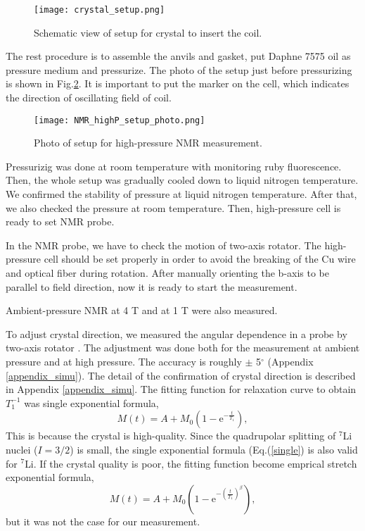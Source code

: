 \documentclass[a4,10.5pt]{report}
\begin{document}
\begin{figure}
  \centering
  \texttt{[image: crystal\_setup.png]}
  \caption{Schematic view of setup for crystal to insert the coil.}
  \label{crystal_setup}
\end{figure}

The rest procedure is to assemble the anvils and gasket, put Daphne 7575 oil as pressure medium and pressurize.
The photo of the setup just before pressurizing is shown in Fig.\ref{NMR_highP_setup_photo}.
It is important to put the marker on the cell, which indicates the direction of oscillating field of coil.

\begin{figure}
  \centering
  \texttt{[image: NMR\_highP\_setup\_photo.png]}
  \caption{Photo of setup for high-pressure NMR measurement.}
  \label{NMR_highP_setup_photo}
\end{figure}

Pressurizig was done at room temperature with monitoring ruby fluorescence.
Then, the whole setup was gradually cooled down to liquid nitrogen temperature.
We confirmed the stability of pressure at liquid nitrogen temperature.
After that, we also checked the pressure at room temperature.
Then, high-pressure cell is ready to set NMR probe.

In the NMR probe, we have to check the motion of two-axis rotator.
The high-pressure cell should be set properly in order to avoid the breaking of the Cu wire and optical fiber during rotation.
After manually orienting the b-axis to be parallel to field direction, now it is ready to start the measurement.

Ambient-pressure NMR at 4 T and at 1 T were also measured.

To adjust crystal direction, we measured the angular dependence in a probe by two-axis rotator \cite{Kitagawa2010}. 
The adjustment was done both for the measurement at ambient pressure and at high pressure.
The accuracy is roughly $\pm$ 5$^\circ$ (Appendix \ref{appendix_simu}).
The detail of the confirmation of crystal direction is described in Appendix \ref{appendix_simu}.
The fitting function for relaxation curve to obtain $T^{-1}_1$ was single exponential formula,
\begin{equation}
M (t) = A + M_0 (1 - \mathrm{e}^{-\frac{t}{T_1}}),
\label{single}
\end{equation}
This is because the crystal is high-quality.
Since the quadrupolar splitting of ${}^7$Li nuclei ($I = 3/2$) is small, the single exponential formula (Eq.(\ref{single}) is also valid for ${}^7$Li.
If the crystal quality is poor, the fitting function become emprical stretch exponential formula,
\begin{equation}
M (t) = A + M_0 (1 - \mathrm{e}^{-\left(\frac{t}{T_1}\right)^\beta}),
\end{equation}
but it was not the case for our measurement.
\end{document}
